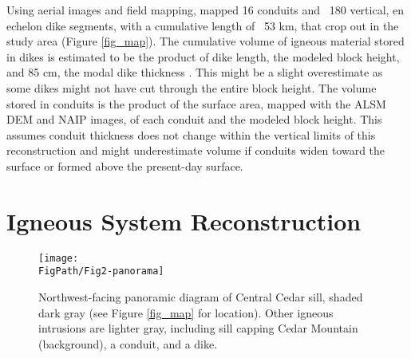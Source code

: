 Using aerial images and field mapping, \citet{kiyosugi2012relationship} mapped 16 conduits and ~180 vertical, en echelon dike segments, with a cumulative length of ~53 km, that crop out in the study area (Figure \ref{fig_map}). The cumulative volume of igneous material stored in dikes is estimated to be the product of dike length, the modeled block height, and 85 cm, the modal dike thickness \citep{delaney1997physical}. This might be a slight overestimate as some dikes might not have cut through the entire block height. The volume stored in conduits is the product of the surface area, mapped with the ALSM DEM and NAIP images, of each conduit and the modeled block height. This assumes conduit thickness does not change within the vertical limits of this reconstruction and might underestimate volume if conduits widen toward the surface or formed above the present-day surface.

\section{Igneous System Reconstruction}

\begin{figure}
\centering
\texttt{[image: \\FigPath/Fig2-panorama]}
\caption[Northwest-facing panoramic diagram of Central Cedar sill]{Northwest-facing panoramic diagram of Central Cedar sill, shaded dark gray (see Figure \ref{fig_map} for location). Other igneous intrusions are lighter gray, including sill capping Cedar Mountain (background), a conduit, and a dike.}
\label{fig_panorama}
\end{figure}

